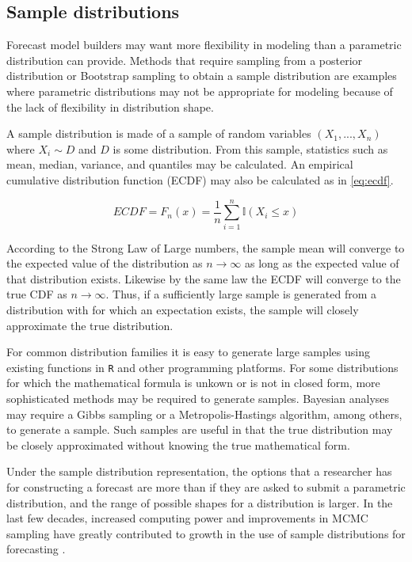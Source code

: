 \documentclass[11pt,notitlepage]{isuthesis}
\begin{document}
\subsection{Sample distributions}
Forecast model builders may want more flexibility in modeling than a 
parametric 
distribution can provide. Methods that require sampling from a posterior 
distribution or Bootstrap sampling to obtain a sample distribution are examples
where parametric distributions may not be appropriate for modeling because of 
the lack of flexibility in distribution shape.

A sample distribution is made of a sample of random variables 
$(X_1,...,X_n)$ where $X_i \sim D$ and $D$ is some distribution. From this 
sample,
statistics such as mean, median, variance, and quantiles may be calculated. 
An empirical cumulative distribution function (ECDF) may also be calculated as
in \eqref{eq:ecdf}.

\begin{equation}
\label{eq:ecdf}
  ECDF = F_n(x) = \frac{1}{n} \sum_{i=1}^n \mathbb{I}(X_i \leq x)
\end{equation}

According to the Strong Law of Large numbers, the sample mean will converge to
the expected value of the distribution as $n \rightarrow \infty$ as long as the 
expected value of that distribution exists. Likewise by the same law the 
ECDF will converge to the true CDF 
as $n \rightarrow \infty$. Thus, if a sufficiently large 
sample is generated from a distribution with for which an expectation exists, 
the sample will closely approximate the 
true distribution. 

For common distribution families it is easy to generate large samples using 
existing functions in \texttt{R} and other programming platforms. For some 
distributions 
for which the mathematical formula is unkown or is not in closed form, more 
sophisticated methods may be required to generate samples. Bayesian analyses may 
require a Gibbs sampling or a Metropolis-Hastings algorithm, among others, 
to generate a 
sample. Such samples are useful in that the true distribution may be closely 
approximated without knowing the true mathematical form. 

Under the sample distribution representation, the options that a researcher has 
for constructing a forecast are more than
if they are asked to submit a parametric distribution, and the range of possible 
shapes for a distribution is larger.
In the last few decades, increased computing power and improvements in MCMC
sampling have greatly contributed to growth in the use of
sample distributions for forecasting \cite[]{gneiting2007strictly}
\cite[see examples listed therein]{krueger2016probabilistic}.
\end{document}
